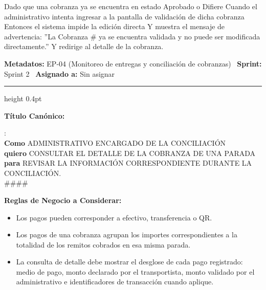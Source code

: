 \documentclass[a4paper,9pt]{article}
\begin{document}
\begin{tcolorbox}[hucard, title={\textbf{HU-49: VALIDAR COBRANZA} \hfill \scriptsize \colorbox{bluestatus}{\textbf{\ New\ }} \quad \colorbox{white}{\textcolor{primarydark}{\textbf{\ 5 pts\ }}}}]
{Dado que una cobranza ya se encuentra en estado Aprobado o Difiere Cuando el administrativo intenta ingresar a la pantalla de validación de dicha cobranza Entonces el sistema impide la edición directa Y muestra el mensaje de advertencia: ''La Cobranza \# ya se encuentra validada y no puede ser modificada directamente.'' Y redirige al detalle de la cobranza.\par\vspace{2.5pt}
}\par
\end{tcolorbox}

\begin{tcolorbox}[hucard, title={\textbf{HU-50: VER DETALLE DE COBRANZA} \hfill \scriptsize \colorbox{bluestatus}{\textbf{\ New\ }} \quad \colorbox{white}{\textcolor{primarydark}{\textbf{\ 2 pts\ }}}}]
\vspace{-1pt}
\noindent\textbf{\footnotesize Metadatos:} EP-04 (Monitoreo de entregas y conciliación de cobranzas) \textbar\ \textbf{Sprint:} Sprint 2 \textbar\ \textbf{Asignado a:} Sin asignar\par\vspace{2pt}
\hrule height 0.4pt\par\vspace{3pt}
\noindent\textbf{\footnotesize Título Canónico:}\par\vspace{1pt}
{\small : \\ \textbf{Como} ADMINISTRATIVO ENCARGADO DE LA CONCILIACIÓN \\ \textbf{quiero} CONSULTAR EL DETALLE DE LA COBRANZA DE UNA PARADA \\ \textbf{para} REVISAR LA INFORMACIÓN CORRESPONDIENTE DURANTE LA CONCILIACIÓN. \\ \#\#\#\#}\par\vspace{3pt}
\noindent\textbf{\footnotesize Reglas de Negocio a Considerar:}\par\vspace{1pt}
{\footnotesize
\begin{itemize}[leftmargin=12pt, nosep, itemsep=1.5pt, topsep=1pt]
\item Los pagos pueden corresponder a efectivo, transferencia o QR.
\item Los pagos de una cobranza agrupan los importes correspondientes a la totalidad de los remitos cobrados en esa misma parada.
\item La consulta de detalle debe mostrar el desglose de cada pago registrado: medio de pago, monto declarado por el transportista, monto validado por el administrativo e identificadores de transacción cuando aplique.

\end{itemize}}
\end{tcolorbox}
\end{document}

